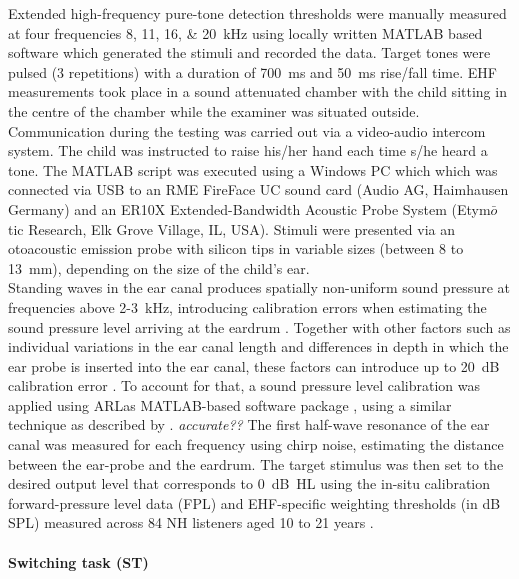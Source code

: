 \documentclass[a4paper, twoside]{templates/ociamthesis}
\begin{document}
Extended high-frequency pure-tone detection thresholds were manually measured at four frequencies 8, 11, 16, \& 20~kHz using locally written MATLAB based software which generated the stimuli and recorded the data. Target tones were pulsed (3 repetitions) with a duration of 700~ms and 50~ms rise/fall time. EHF measurements took place in a sound attenuated chamber with the child sitting in the centre of the chamber while the examiner was situated outside. Communication during the testing was carried out via a video-audio intercom system. The child was instructed to raise his/her hand each time s/he heard a tone. The MATLAB script was executed using a Windows PC which which was connected via USB to an RME FireFace UC sound card (Audio AG, Haimhausen Germany) and an ER10X Extended-Bandwidth Acoustic Probe System (Etym\(\bar{o}\)tic Research, Elk Grove Village, IL, USA). Stimuli were presented via an otoacoustic emission probe with silicon tips in variable sizes (between 8 to 13~mm), depending on the size of the child's ear.\\

Standing waves in the ear canal produces spatially non-uniform sound pressure at frequencies above 2-3~kHz, introducing calibration errors when estimating the sound pressure level arriving at the eardrum \autocite{Siegel1994,Richmond2011,Lee2012}. Together with other factors such as individual variations in the ear canal length and differences in depth in which the ear probe is inserted into the ear canal, these factors can introduce up to 20~dB calibration error \autocite{Siegel1994}. To account for that, a sound pressure level calibration was applied using ARLas MATLAB-based software package \autocite{ARLas}, using a similar technique as described by \textcite{Lee2012}. \colorbox[HTML]{CCCCFF}{\emph{accurate??}} The first half-wave resonance of the ear canal was measured for each frequency using chirp noise, estimating the distance between the ear-probe and the eardrum. The target stimulus was then set to the desired output level that corresponds to 0~dB~HL using the in-situ calibration forward-pressure level data (FPL) and EHF-specific weighting thresholds (in dB SPL) measured across 84 NH listeners aged 10 to 21 years \autocite[see Table 1 in][]{Lee2012}.

\hypertarget{switching-task-st}{%
\paragraph{Switching task (ST)}\label{switching-task-st}}
\end{document}
